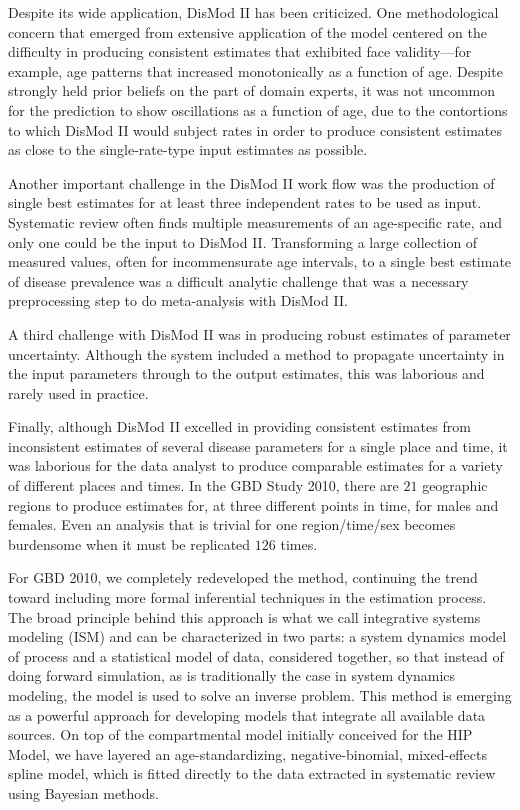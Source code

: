 Despite its wide application, DisMod II has been
criticized.  One methodological concern that emerged from extensive
application of the model centered on the difficulty in producing
consistent estimates that exhibited face validity---for example, age
patterns that increased monotonically as a function of age. Despite
strongly held prior beliefs on the part of domain experts, it was not
uncommon for the prediction to show oscillations as a function of age, due
to the contortions to which DisMod II would subject rates in order to
produce consistent estimates as close to the single-rate-type input
estimates as possible.

Another important challenge in the DisMod II work flow was the
production of single best estimates for at least three independent
rates to be used as input.  Systematic review often finds multiple
measurements of an age-specific rate, and only one could be the input to
DisMod II.  Transforming a large collection of measured values, often
for incommensurate age intervals, to a single best estimate of disease
prevalence was a difficult analytic challenge that was a necessary
preprocessing step to do meta-analysis with DisMod II.

A third challenge with DisMod II was in producing robust estimates of
parameter uncertainty.  Although the system included a method to
propagate uncertainty in the input parameters through to the output
estimates, this was laborious and rarely used in practice.

Finally, although DisMod II excelled in providing consistent estimates
from inconsistent estimates of several disease
parameters for a single place and time, it was laborious
for the data analyst to produce comparable estimates for a variety of
different places and times. In the GBD 
Study 2010, there are $21$ geographic regions to produce estimates for, at
three different points in time, for males and females. Even an
analysis that is trivial for one region/time/sex becomes burdensome
when it must be replicated $126$ times.

For GBD 2010, we completely redeveloped the method,
continuing the trend toward including more formal inferential
techniques in the estimation process.  The broad principle behind this
approach is what we call integrative systems modeling (ISM) and can be
characterized in two parts: a system dynamics model of process and a
statistical model of data, considered together, so that instead of
doing forward simulation, as is traditionally the case in system
dynamics modeling, the model is used to solve an inverse problem. This
method is emerging as a powerful approach for developing models that
integrate all available data sources.  On top of the compartmental
model initially conceived for the HIP Model, we have layered an
age-standardizing, negative-binomial, mixed-effects spline model,
which is fitted directly to the data extracted in systematic review
using Bayesian methods.

